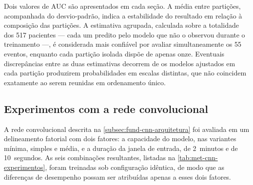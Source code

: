 Dois valores de \gls{AUC} são apresentados em cada seção. A média entre
partições, acompanhada do desvio-padrão, indica a estabilidade do resultado
em relação à composição das partições. A estimativa agrupada, calculada sobre
a totalidade dos 517 pacientes --- cada um predito pelo modelo que não o
observou durante o treinamento ---, é considerada mais confiável por avaliar
simultaneamente os 55 eventos, enquanto cada partição isolada dispõe de
apenas onze. Eventuais discrepâncias entre as duas estimativas decorrem de os
modelos ajustados em cada partição produzirem probabilidades em escalas
distintas, que não coincidem exatamente ao serem reunidas em ordenamento
único.


\subsection{Experimentos com a rede convolucional}
\label{subsec:met-cnn-experimentos}

A rede convolucional descrita na \autoref{subsec:fund-cnn-arquitetura} foi
avaliada em um delineamento fatorial com dois fatores: a capacidade do
modelo, nas variantes mínima, simples e média, e a duração da janela de
entrada, de 2~minutos e de 10~segundos. As seis combinações resultantes,
listadas na \autoref{tab:met-cnn-experimentos}, foram treinadas sob
configuração idêntica, de modo que as diferenças de desempenho possam ser
atribuídas apenas a esses dois fatores.

\begin{table}[h!]
	\captionsetup{width=12cm}
\end{table}

